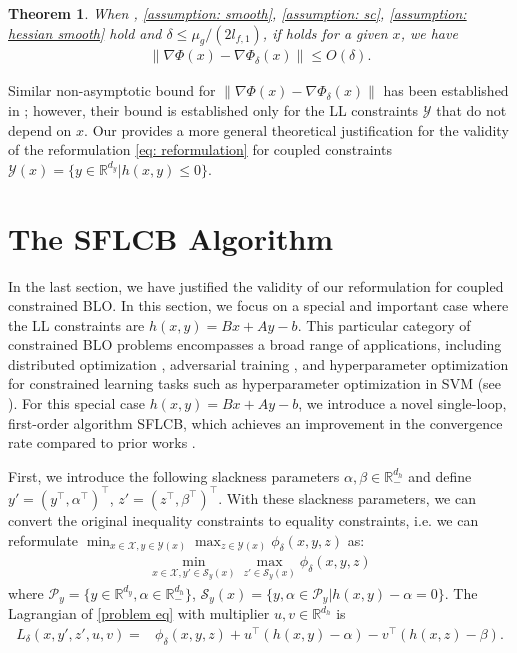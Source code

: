 \documentclass{article}
\newcommand{\Pc}{\mathcal{P}}
\newcommand{\Sc}{\mathcal{S}}
\newcommand{\Xc}{\mathcal{X}}
\newcommand{\Yc}{\mathcal{Y}}
\def\R{\mathbb{R}}
\theoremstyle{plain}
\newtheorem{theorem}{Theorem}[section]
\theoremstyle{definition}
\theoremstyle{remark}
\begin{document}
\begin{theorem}\label{thm: closeness of nabla Phi}
 When , \ref{assumption: smooth}, \ref{assumption: sc}, \ref{assumption: hessian smooth} hold and $\delta \leq \mu_g/(2l_{f,1})$, if  holds for a given $x$, we have
    \begin{align*}
        \|\nabla \Phi(x)-\nabla \Phi_\delta(x)\|\leq O(\delta).
    \end{align*}
\end{theorem}



Similar non-asymptotic bound for $\|\nabla \Phi(x)-\nabla \Phi_\delta(x)\|$ has been established in \cite{kwon2023penalty}; however, their bound is established only for the LL constraints $\Yc$ that do not depend on $x$. Our  provides a more general theoretical justification for the validity of the reformulation \eqref{eq: reformulation} for coupled constraints $\Yc(x)=\{y\in \R^{d_y} | h(x,y)\leq 0\}$. 


\section{The SFLCB Algorithm}

In the last section, we have justified the validity of our reformulation for coupled constrained BLO. In this section, we focus on a special and important case where the LL constraints are $h(x,y)=Bx+Ay-b$. This particular category of constrained BLO problems encompasses a broad range of applications, including distributed optimization \citep{yang2022decentralized, khanduri2023linearly},  adversarial training \citep{zhang2022revisiting, khanduri2023linearly},  and hyperparameter optimization for constrained learning tasks such as hyperparameter optimization in SVM (see ). For this special case $h(x,y)=Bx+Ay-b$, we introduce a novel single-loop, first-order algorithm SFLCB, which achieves an improvement in the convergence rate compared to prior works \citep{kwon2023penalty, jiang2024primal}.

First, we introduce the following slackness parameters $\alpha, \beta\in \R^{d_h}_-$ and define $y'=(y^\top,\alpha^\top)^\top$,  $z'=(z^\top,\beta^\top)^\top$. With these slackness parameters, we can convert the original inequality constraints to equality constraints, i.e. we can reformulate $\min_{x\in \Xc, y\in \Yc(x)}\max_{z\in \Yc(x)}\phi_\delta(x,y,z)$ as:
\begin{align}\label{problem eq}
    \min_{x\in \Xc, y'\in \Sc_y(x)}\max_{z'\in \Sc_y(x)}\phi_\delta(x,y,z) 
\end{align}
where $\Pc_y=\{y\in\R^{d_y}, \alpha \in\R^{d_h}_-\}$, $\Sc_y(x)=\{y,\alpha \in \Pc_y | h(x,y)-\alpha=0\}$.
The Lagrangian of \eqref{problem eq} with multiplier $u,v\in \R^{d_h}$ is 
\begin{align}\nonumber
L_\delta(x,y',z',u,v)=&\phi_\delta(x,y,z)+u^\top(h(x,y)-\alpha)-v^\top(h(x,z)-\beta).
\end{align}
\end{document}
